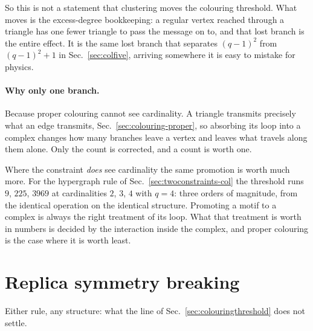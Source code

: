 So this is not a statement that clustering moves the colouring threshold. What
moves is the excess-degree bookkeeping: a regular vertex reached through a
triangle has one fewer triangle to pass the message on to, and that lost branch
is the entire effect. It is the same lost branch that separates
$(q-1)^{2}$ from $(q-1)^{2}+1$ in Sec.~\ref{sec:colfive}, arriving
somewhere it is easy to mistake for physics.

\paragraph{Why only one branch.} Because proper colouring cannot see
cardinality. A triangle transmits precisely what an edge transmits,
Sec.~\ref{sec:colouring-proper}, so absorbing its loop into a complex changes
how many branches leave a vertex and leaves what travels along them alone. Only
the count is corrected, and a count is worth one.

Where the constraint \emph{does} see cardinality the same promotion is worth
much more. For the hypergraph rule of Sec.~\ref{sec:twoconstraints-col} the
threshold runs $9$, $225$, $3969$ at cardinalities $2$, $3$, $4$ with $q=4$:
three orders of magnitude, from the identical operation on the identical
structure. Promoting a motif to a complex is always the right treatment of its
loop. What that treatment is worth in numbers is decided by the interaction
inside the complex, and proper colouring is the case where it is worth least.

\section{Replica symmetry breaking}
\label{sec:colouring-sp}

Either rule, any structure: what the line of Sec.~\ref{sec:colouringthreshold}
does not settle.

